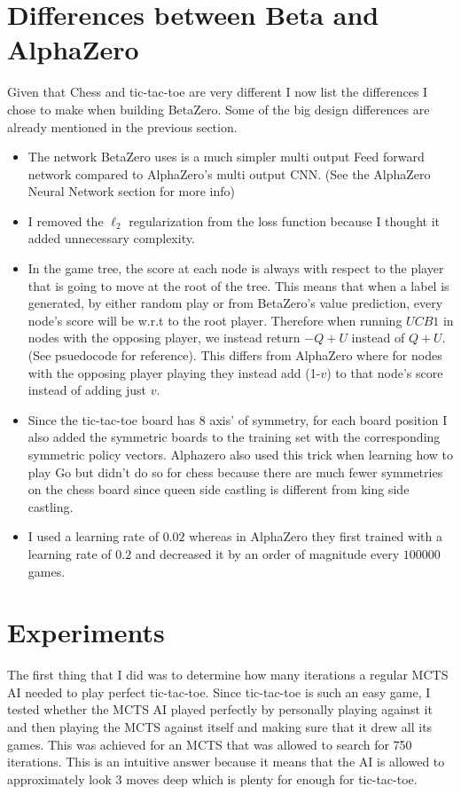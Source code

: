 \documentclass[letterpaper]{article} %
\begin{document}
  \section{Differences between Beta and AlphaZero}
  Given that Chess and tic-tac-toe are very different I now list the differences
  I chose to make when building BetaZero. Some of the big design differences are
  already mentioned in the previous section.
  \begin{itemize}
    \item The network BetaZero uses is a much simpler multi output Feed forward
      network compared to AlphaZero's multi output CNN. (See the AlphaZero
      Neural Network section for more info)
    \item I removed the $\ell_2$ regularization from the loss function because
      I thought it added unnecessary complexity.
    \item In the game tree, the score at each node is always with respect to the
      player that is going to move at the root of the tree. This means that when
      a label is generated, by either random play or from BetaZero's value
      prediction, every node's score will be w.r.t to the root player. Therefore
      when running $UCB1$ in nodes with the opposing player, we instead return
      $-Q + U$ instead of $Q+U$. (See psuedocode for reference). This differs
      from AlphaZero where for nodes with the opposing player playing they
      instead add (1-$v$) to that node's score instead of adding just $v$.
    \item Since the tic-tac-toe board has 8 axis' of symmetry, for each board
      position I also added the symmetric boards to the training set with the
      corresponding symmetric policy vectors. Alphazero also used this trick
      when learning how to play Go but didn't do so for chess because there are
      much fewer symmetries on the chess board since queen side castling is
      different from king side castling.
    \item I used a learning rate of $0.02$ whereas in AlphaZero they first
      trained with a learning rate of $0.2$ and decreased it by an order of
      magnitude every $100000$ games.
  \end{itemize}

  \section{Experiments}
  The first thing that I did was to determine how many iterations a regular MCTS
  AI needed to play perfect tic-tac-toe. Since tic-tac-toe is such an easy game,
  I tested whether the MCTS AI played perfectly by personally playing against it
  and then playing the MCTS against itself and making sure that it drew all its
  games. This was achieved for an MCTS that was allowed to search for 750
  iterations. This is an intuitive answer because it means that the AI is
  allowed to approximately look $3$ moves deep which is plenty for enough for
  tic-tac-toe.
\end{document}
